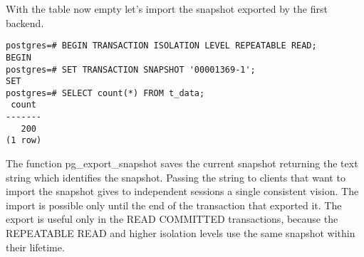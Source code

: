 With the table now empty let's import the snapshot exported by the first backend.

\begin{lstlisting}[style=pgsql]
postgres=# BEGIN TRANSACTION ISOLATION LEVEL REPEATABLE READ;
BEGIN
postgres=# SET TRANSACTION SNAPSHOT '00001369-1';
SET
postgres=# SELECT count(*) FROM t_data;
 count 
-------
   200
(1 row)

\end{lstlisting}

The function pg\_export\_snapshot saves the current snapshot returning the text string which 
identifies the snapshot. Passing the string to clients that want to import the snapshot gives to 
independent sessions a single consistent vision. The import is possible only until the end of the 
transaction that exported it. The export is useful only in the READ COMMITTED transactions, 
because the REPEATABLE READ and higher isolation levels use the same snapshot within their 
lifetime. 

